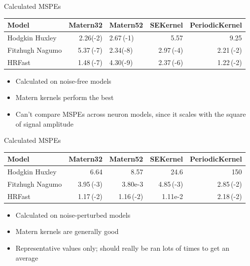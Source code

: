\documentclass[presentation]{beamer}
\begin{document}
\begin{frame}[label={sec:orgd377990}]{Calculated MSPEs}
\begin{center}
\begin{tabular}{lrlrr}
\hline
Model & Matern32 & Matern52 & SEKernel & PeriodicKernel\\
\hline
Hodgkin Huxley & \alert{2.26(-2)} & 2.67\,(-1) & 5.57 & 9.25\\
Fitzhugh Nagumo & 5.37\,(-7) & \alert{2.34(-8)} & 2.97\,(-4) & 2.21\,(-2)\\
HRFast & 1.48\,(-7) & \alert{4.30(-9)} & 2.37\,(-6) & 1.22\,(-2)\\
\hline
\end{tabular}
\end{center}

\begin{itemize}
\item Calculated on noise-free models
\item Matern kernels perform the best
\item Can't compare MSPEs across neuron models, since it scales with the square of signal amplitude
\end{itemize}
\end{frame}

\begin{frame}[label={sec:org555ed0f}]{Calculated MSPEs}
\begin{center}
\begin{tabular}{lrrrr}
\hline
Model & Matern32 & Matern52 & SEKernel & PeriodicKernel\\
\hline
Hodgkin Huxley & \alert{6.64} & 8.57 & 24.6 & 150\\
Fitzhugh Nagumo & 3.95\,(-3) & \alert{3.80e-3} & 4.85\,(-3) & 2.85\,(-2)\\
HRFast & 1.17\,(-2) & 1.16\,(-2) & \alert{1.11e-2} & 2.18\,(-2)\\
\hline
\end{tabular}
\end{center}

\begin{itemize}
\item Calculated on noise-perturbed models
\item Matern kernels are generally good
\item Representative values only; should really be ran lots of times to get an average
\end{itemize}
\end{frame}
\end{document}
